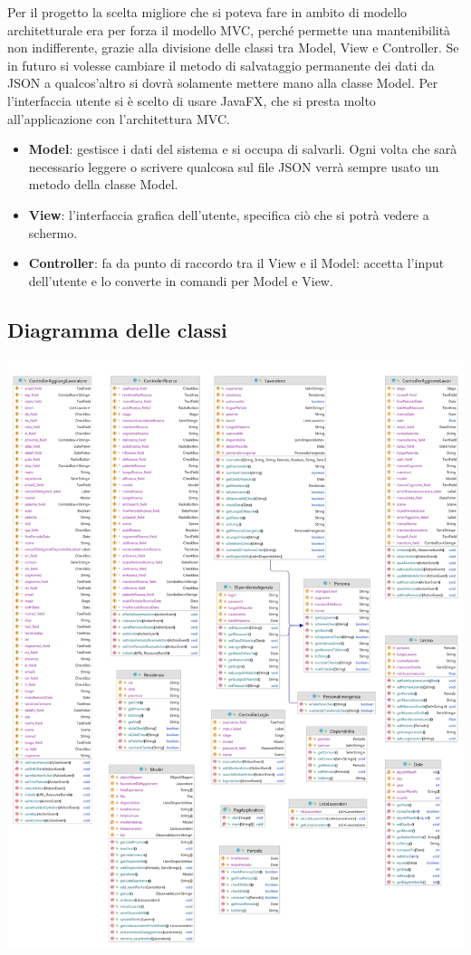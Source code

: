 \documentclass{article}
\begin{document}
    Per il progetto la scelta migliore che si poteva fare in ambito di modello architetturale era per forza il modello MVC, perché permette una mantenibilità non indifferente, grazie alla divisione delle classi tra Model, View e Controller. Se in futuro si volesse cambiare il metodo di salvataggio permanente dei dati da JSON a qualcos'altro si dovrà solamente mettere mano alla classe Model. Per l'interfaccia utente si è scelto di usare JavaFX, che si presta molto all'applicazione con l'architettura MVC.
    \begin{itemize}
        \item[] \textbf{Model}: gestisce i dati del sistema e si occupa di salvarli. Ogni volta che sarà necessario leggere o scrivere qualcosa sul file JSON verrà sempre usato un metodo della classe Model.
        \item[] \textbf{View}: l'interfaccia grafica dell'utente, specifica ciò che si potrà vedere a schermo.
        \item[] \textbf{Controller}: fa da punto di raccordo tra il View e il Model: accetta l’input dell’utente e lo converte in comandi per Model e View.
    \end{itemize}

    \subsection{Diagramma delle classi}

    \includegraphics[width=\linewidth]{class diagram.png}
\end{document}
